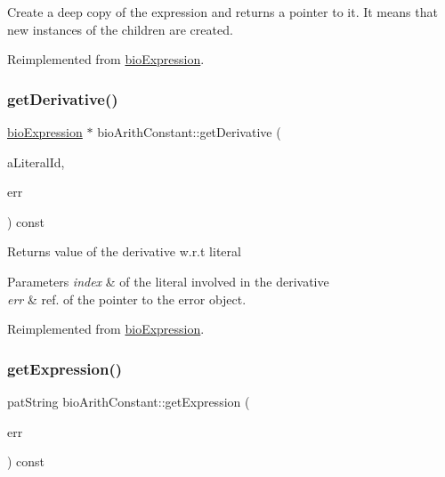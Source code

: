 Create a deep copy of the expression and returns a pointer to it. It means that new instances of the children are created. 

Reimplemented from \hyperlink{classbio_expression_a4ee1b8add634078a02eaae26cd40dcc8}{bio\+Expression}.

\mbox{\label{classbio_arith_constant_afbe5eaceb8943323f7bf0bfd3491b19a}} 
\subsubsection{\texorpdfstring{get\+Derivative()}{getDerivative()}}
{\footnotesize\ttfamily \hyperlink{classbio_expression}{bio\+Expression} $\ast$ bio\+Arith\+Constant\+::get\+Derivative (\begin{DoxyParamCaption}\item[{pat\+U\+Long}]{a\+Literal\+Id,  }\item[{pat\+Error $\ast$\&}]{err }\end{DoxyParamCaption}) const\hspace{0.3cm}{\ttfamily [virtual]}}

\begin{DoxyReturn}{Returns}
value of the derivative w.\+r.\+t literal 
\end{DoxyReturn}

\begin{DoxyParams}{Parameters}
{\em index} & of the literal involved in the derivative \\
\hline
{\em err} & ref. of the pointer to the error object. \\
\hline
\end{DoxyParams}


Reimplemented from \hyperlink{classbio_expression_a5915579d1193f25f216c1e273c97f2ce}{bio\+Expression}.

\mbox{\label{classbio_arith_constant_a50fd07c61fc6674c05f23345b972807c}} 
\subsubsection{\texorpdfstring{get\+Expression()}{getExpression()}}
{\footnotesize\ttfamily pat\+String bio\+Arith\+Constant\+::get\+Expression (\begin{DoxyParamCaption}\item[{pat\+Error $\ast$\&}]{err }\end{DoxyParamCaption}) const\hspace{0.3cm}{\ttfamily [virtual]}}


